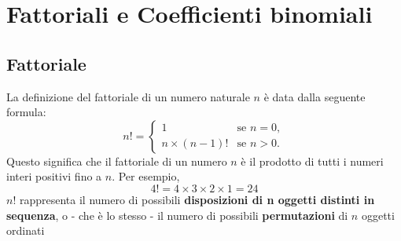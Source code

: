 \documentclass{book}
\begin{document}
\section{Fattoriali e Coefficienti binomiali}
\begin{definition}
    \subsection{Fattoriale}
    La definizione del fattoriale di un numero naturale \( n \) è data dalla seguente formula:
    \[n! = \begin{cases}
            1               & \text{se } n = 0, \\
            n \times (n-1)! & \text{se } n > 0.
        \end{cases}\]
    Questo significa che il fattoriale di un numero \( n \) è il prodotto di tutti i numeri interi positivi fino a \( n \). Per esempio, \[ 4! = 4 \times 3 \times 2 \times 1 = 24 \]
    \(n!\) rappresenta il numero di possibili \textbf{disposizioni di n oggetti distinti in sequenza}, o - che è lo stesso - il numero di possibili \textbf{permutazioni} di \(n\) oggetti ordinati
\end{definition}
\end{document}
